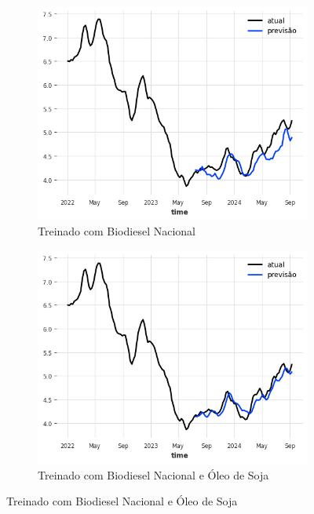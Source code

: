 \begin{figure}[htbp]
	\centering
	\begin{subfigure}[b]{0.45\textwidth}
		\centering
		\includegraphics[width=\textwidth]{figuras/idln_takens_brasil_plot.png} %
		\caption{Treinado com Biodiesel Nacional \newline}
		\label{fig:idln_takens_brasil_plot}
	\end{subfigure}
	\hfill
	\begin{subfigure}[b]{0.45\textwidth}
		\centering
		\includegraphics[width=\textwidth]{figuras/idln_takens_brasil_oil_plot.png} %
		\caption{Treinado com Biodiesel Nacional e Óleo de Soja}
		\label{fig:idln_takens_brasil_oil_plot}
	\end{subfigure}


\end{figure}
